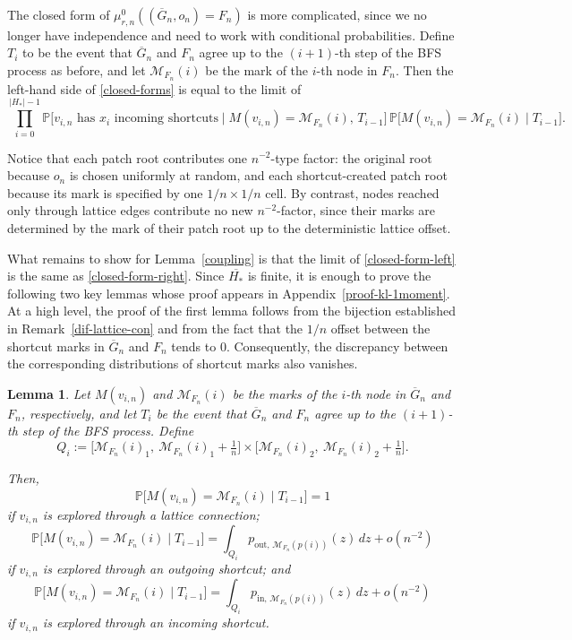 \documentclass[10pt]{amsart}
\newtheorem{lemma}[theorem]{Lemma}
\begin{document}
The closed form of $\mu_{r,n}^0((\overline{G}_n,o_n)=F_n)$ is more complicated,
since we no longer have independence and need to work with conditional
probabilities. Define $T_i$ to be the event that $\overline{G}_n$ and $F_n$
agree up to the $(i+1)$-th step of the BFS process as before, and let
$\mathcal M_{F_n}(i)$ be the mark of the $i$-th node in $F_n$. Then the
left-hand side of \eqref{closed-forms} is equal to the limit of
\begin{equation}\label{closed-form-left}
\prod_{i=0}^{|H_*|-1}
\mathbb P\big[\text{$v_{i,n}$ has $x_i$ incoming shortcuts}\mid
M(v_{i,n})=\mathcal M_{F_n}(i),\,T_{i-1}\big]\,
\mathbb P\big[M(v_{i,n})=\mathcal M_{F_n}(i)\mid T_{i-1}\big].
\end{equation}

Notice that each patch root contributes one $n^{-2}$-type factor: the original
root because $o_n$ is chosen uniformly at random, and each shortcut-created
patch root because its mark is specified by one $1/n\times1/n$ cell. By
contrast, nodes reached only through lattice edges contribute no new
$n^{-2}$-factor, since their marks are determined by the mark of their patch
root up to the deterministic lattice offset.

What remains to show for Lemma~\ref{coupling} is that the limit of
\eqref{closed-form-left} is the same as \eqref{closed-form-right}. Since
$\overline{H_*}$ is finite, it is enough to prove the following two key lemmas whose proof appears in Appendix~\ref{proof-kl-1moment}. At a high level, the proof of the first lemma follows from the bijection established in Remark~\ref{dif-lattice-con} and from the fact that the \(1/n\) offset between the shortcut marks in \(\overline{G}_n\) and \(F_n\) tends to \(0\). Consequently, the discrepancy between the corresponding distributions of shortcut marks also vanishes.

\begin{lemma}\label{mark-conv}
Let $M(v_{i,n})$ and $\mathcal M_{F_n}(i)$ be the marks of the $i$-th node in
$\overline{G}_n$ and $F_n$, respectively, and let $T_i$ be the event that
$\overline{G}_n$ and $F_n$ agree up to the $(i+1)$-th step of the BFS process.
Define
\[
Q_i := \big[\mathcal{M}_{F_n}(i)_1,\ \mathcal{M}_{F_n}(i)_1+\tfrac{1}{n}\big]
       \times
       \big[\mathcal{M}_{F_n}(i)_2,\ \mathcal{M}_{F_n}(i)_2+\tfrac{1}{n}\big].
\]

Then,
    \[
    \mathbb P\big[M(v_{i,n})=\mathcal M_{F_n}(i)\mid T_{i-1}\big]=1
    \]
    if $v_{i,n}$ is explored through a lattice connection;
    \[
    \mathbb P\big[M(v_{i,n})=\mathcal M_{F_n}(i)\mid T_{i-1}\big]
    =
    \int_{Q_i} p_{\mathrm{out},\,\mathcal M_{F_n}(p(i))}(z)\,dz
    + o(n^{-2})
    \]
    if $v_{i,n}$ is explored through an outgoing shortcut; and
    \[
    \mathbb P\big[M(v_{i,n})=\mathcal M_{F_n}(i)\mid T_{i-1}\big]
    =
    \int_{Q_i} p_{\mathrm{in},\,\mathcal M_{F_n}(p(i))}(z)\,dz
    + o(n^{-2})
    \]
    if $v_{i,n}$ is explored through an incoming shortcut.
\end{lemma}
\end{document}
